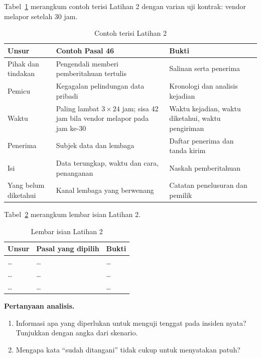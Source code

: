 Tabel~\ref{tab:ch03-lat2-contoh} merangkum contoh terisi Latihan 2 dengan varian uji kontrak: vendor melapor setelah 30 jam.
\begin{table}[!htb]
  \centering\small
  \caption{Contoh terisi Latihan 2}\label{tab:ch03-lat2-contoh}
  \begin{tabularx}{\textwidth}{|>{\raggedright\arraybackslash}p{}|>{\raggedright\arraybackslash}X|>{\raggedright\arraybackslash}X|}
    \hline
    \textbf{Unsur} & \textbf{Contoh Pasal 46} & \textbf{Bukti} \\ \hline
    Pihak dan tindakan & Pengendali memberi pemberitahuan tertulis & Salinan serta penerima \\ \hline
    Pemicu & Kegagalan pelindungan data pribadi & Kronologi dan analisis kejadian \\ \hline
    Waktu & Paling lambat $3 \times 24$ jam; sisa 42 jam bila vendor melapor pada jam ke-30 & Waktu kejadian, waktu
    diketahui, waktu pengiriman \\ \hline
    Penerima & Subjek data dan lembaga & Daftar penerima dan tanda kirim \\ \hline
    Isi & Data terungkap, waktu dan cara, penanganan & Naskah pemberitahuan \\ \hline
    Yang belum diketahui & Kanal lembaga yang berwenang & Catatan penelusuran dan pemilik \\ \hline
  \end{tabularx}
\end{table}

Tabel~\ref{tab:ch03-lat2-hasil} merangkum lembar isian Latihan 2.
\begin{table}[!htb]
  \centering\small
  \caption{Lembar isian Latihan 2}\label{tab:ch03-lat2-hasil}
  \begin{tabularx}{\textwidth}{|>{\raggedright\arraybackslash}p{}|>{\raggedright\arraybackslash}X|>{\raggedright\arraybackslash}X|}
    \hline
    \textbf{Unsur} & \textbf{Pasal yang dipilih} & \textbf{Bukti} \\ \hline
    \dots & \dots & \dots \\ \hline
    \dots & \dots & \dots \\ \hline
    \dots & \dots & \dots \\ \hline
  \end{tabularx}
\end{table}

\textbf{Pertanyaan analisis.}
\begin{enumerate}
  \item Informasi apa yang diperlukan untuk menguji tenggat pada insiden nyata? Tunjukkan dengan angka dari skenario.
  \item Mengapa kata ``sudah ditangani'' tidak cukup untuk menyatakan patuh?
\end{enumerate}

